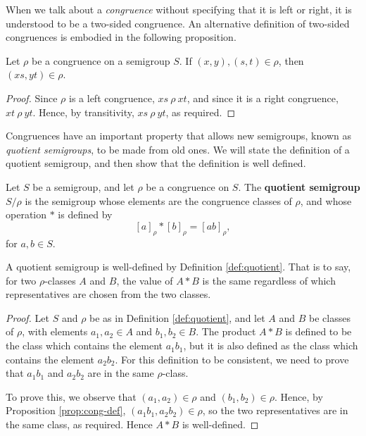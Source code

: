 When we talk about a \textit{congruence} without specifying that it is left or
right, it is understood to be a two-sided congruence.   An alternative
definition of two-sided congruences is embodied in the following proposition.

\begin{proposition}
  \label{prop:cong-def}
  Let $\rho$ be a congruence on a semigroup $S$.  If $(x, y), (s, t) \in \rho$,
  then $(xs, yt) \in \rho$.
  \begin{proof}
    Since $\rho$ is a left congruence, $xs ~\rho~ xt$, and since it is a right
    congruence, $xt ~\rho~ yt$.  Hence, by transitivity, $xs ~\rho~ yt$, as
    required.
  \end{proof}
\end{proposition}

Congruences have an important property that allows new semigroups, known as
\textit{quotient semigroups}, to be made from old ones.  We will state the
definition of a quotient semigroup, and then show that the definition is well
defined.

\begin{definition}
  \label{def:quotient}
  Let $S$ be a semigroup, and let $\rho$ be a congruence on $S$.  The
  \textbf{quotient semigroup} $S / \rho$ is the semigroup whose elements are the
  congruence classes of $\rho$, and whose operation $*$ is defined by
  $$[a]_\rho * [b]_\rho = [ab]_\rho,$$
  for $a, b \in S$.
\end{definition}

\begin{proposition}
  \label{thm:quotient-well-defined}
  A quotient semigroup is well-defined by Definition \ref{def:quotient}.  That
  is to say, for two $\rho$-classes $A$ and $B$, the value of $A * B$ is the
  same regardless of which representatives are chosen from the two classes.
  \begin{proof}
    Let $S$ and $\rho$ be as in Definition \ref{def:quotient}, and let $A$ and
    $B$ be classes of $\rho$, with elements $a_1,a_2 \in A$ and $b_1,b_2 \in B$.
    The product $A*B$ is defined to be the class which contains the element
    $a_1b_1$, but it is also defined as the class which contains the element
    $a_2b_2$.  For this definition to be consistent, we need to prove that
    $a_1b_1$ and $a_2b_2$ are in the same $\rho$-class.

    To prove this, we observe that $(a_1,a_2) \in \rho$ and
    $(b_1,b_2) \in \rho$.  Hence, by Proposition \ref{prop:cong-def},
    $(a_1b_1, a_2b_2) \in \rho$, so the two representatives are in the same
    class, as required.  Hence $A * B$ is well-defined.
  \end{proof}
\end{proposition}

